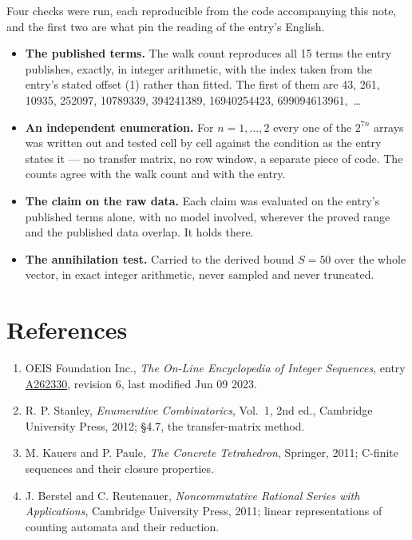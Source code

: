 \documentclass[11pt]{article}
\theoremstyle{definition}
\begin{document}
Four checks were run, each reproducible from the code accompanying this note, and the first two are what pin the reading of the entry's English.

\begin{itemize}

\item {\bfseries The published terms.} The walk count reproduces all 15 terms the entry publishes, exactly, in integer arithmetic, with the index taken from the entry's stated offset (1) rather than fitted. The first of them are 43, 261, 10935, 252097, 10789339, 394241389, 16940254423, 699094613961,~\dots

\item {\bfseries An independent enumeration.} For $n = 1,\dots,2$ every one of the $2^{7n}$ arrays was written out and tested cell by cell against the condition as the entry states it --- no transfer matrix, no row window, a separate piece of code. The counts agree with the walk count and with the entry.

\item {\bfseries The claim on the raw data.} Each claim was evaluated on the entry's published terms alone, with no model involved, wherever the proved range and the published data overlap. It holds there.

\item {\bfseries The annihilation test.} Carried to the derived bound $S = 50$ over the whole vector, in exact integer arithmetic, never sampled and never truncated.

\end{itemize}

\section{References}

\begin{enumerate}

\item OEIS Foundation Inc., \emph{The On-Line Encyclopedia of Integer Sequences}, entry \href{https://oeis.org/A262330}{A262330}, revision 6, last modified Jun 09 2023.

\item R. P. Stanley, \emph{Enumerative Combinatorics}, Vol.~1, 2nd ed., Cambridge University Press, 2012; \S4.7, the transfer-matrix method.

\item M. Kauers and P. Paule, \emph{The Concrete Tetrahedron}, Springer, 2011; C-finite sequences and their closure properties.

\item J. Berstel and C. Reutenauer, \emph{Noncommutative Rational Series with Applications}, Cambridge University Press, 2011; linear representations of counting automata and their reduction.

\end{enumerate}
\end{document}
